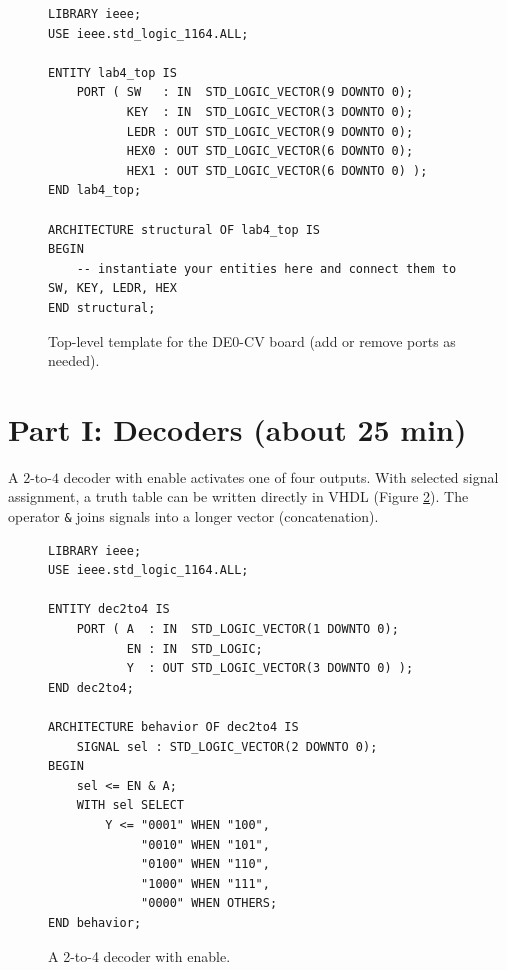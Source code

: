 \documentclass{article}
\begin{document}
\begin{figure}[H]
    \centering
    \begin{verbatim}
LIBRARY ieee;
USE ieee.std_logic_1164.ALL;

ENTITY lab4_top IS
    PORT ( SW   : IN  STD_LOGIC_VECTOR(9 DOWNTO 0);
           KEY  : IN  STD_LOGIC_VECTOR(3 DOWNTO 0);
           LEDR : OUT STD_LOGIC_VECTOR(9 DOWNTO 0);
           HEX0 : OUT STD_LOGIC_VECTOR(6 DOWNTO 0);
           HEX1 : OUT STD_LOGIC_VECTOR(6 DOWNTO 0) );
END lab4_top;

ARCHITECTURE structural OF lab4_top IS
BEGIN
    -- instantiate your entities here and connect them to SW, KEY, LEDR, HEX
END structural;
    \end{verbatim}
    \caption{Top-level template for the DE0-CV board (add or remove ports as needed).}
    \label{fig:top}
\end{figure}

\section*{Part I: Decoders (about 25 min)}

A $2$-to-$4$ decoder with enable activates one of four outputs. With selected signal assignment, a truth table can be written directly in VHDL (Figure \ref{fig:dec_vhdl}). The operator \texttt{\&} joins signals into a longer vector (concatenation).

\begin{figure}[H]
    \centering
    \begin{verbatim}
LIBRARY ieee;
USE ieee.std_logic_1164.ALL;

ENTITY dec2to4 IS
    PORT ( A  : IN  STD_LOGIC_VECTOR(1 DOWNTO 0);
           EN : IN  STD_LOGIC;
           Y  : OUT STD_LOGIC_VECTOR(3 DOWNTO 0) );
END dec2to4;

ARCHITECTURE behavior OF dec2to4 IS
    SIGNAL sel : STD_LOGIC_VECTOR(2 DOWNTO 0);
BEGIN
    sel <= EN & A;
    WITH sel SELECT
        Y <= "0001" WHEN "100",
             "0010" WHEN "101",
             "0100" WHEN "110",
             "1000" WHEN "111",
             "0000" WHEN OTHERS;
END behavior;
    \end{verbatim}
    \caption{A 2-to-4 decoder with enable.}
    \label{fig:dec_vhdl}
\end{figure}
\end{document}
